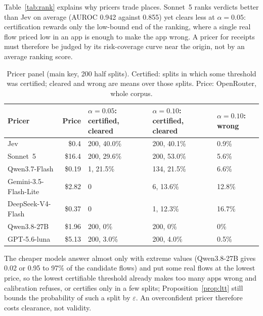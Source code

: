 \begin{table}[t]
\caption{Ranking quality is not what certification rewards. AUROC of the bound (real flows against leak-free sinks, all verdicts), and the certified result over 200 half splits.}
\label{tab:rank}
\small

\end{table}
Table~\ref{tab:rank} explains why pricers trade places.
Sonnet~5 ranks verdicts better than Jev on average (AUROC 0.942 against 0.855) yet clears less at $\alpha=0.05$: certification rewards only the low-bound end of the ranking, where a single real flow priced low in an app is enough to make the app wrong.
A pricer for receipts must therefore be judged by its risk-coverage curve near the origin, not by an average ranking score.
\begin{table}[t]
\caption{Pricer panel (main key, 200 half splits). Certified: splits in which some threshold was certified; cleared and wrong are means over those splits. Price: OpenRouter, whole corpus.}
\label{tab:panel}
\small
\begin{tabular}{@{}lrlll@{}}
\toprule
Pricer & Price & $\alpha=0.05$: certified, cleared & $\alpha=0.10$: certified, cleared & $\alpha=0.10$: wrong\\
\midrule
Jev & \$0.4 & 200, 40.0\% & 200, 40.1\% & 0.9\%\\
Sonnet~5 & \$16.4 & 200, 29.6\% & 200, 53.0\% & 5.6\%\\
Qwen3.7-Flash & \$0.19 & 1, 21.5\% & 134, 21.5\% & 6.6\%\\
Gemini-3.5-Flash-Lite & \$2.82 & 0 & 6, 13.6\% & 12.8\%\\
DeepSeek-V4-Flash & \$0.37 & 0 & 1, 12.3\% & 16.7\%\\
Qwen3.8-27B & \$1.96 & 200, 0\% & 200, 0\% & 0\%\\
GPT-5.6-luna & \$5.13 & 200, 3.0\% & 200, 4.0\% & 0.5\%\\
\bottomrule
\end{tabular}
\end{table}
The cheaper models answer almost only with extreme values (Qwen3.8-27B gives 0.02 or 0.95 to 97\% of the candidate flows) and put some real flows at the lowest price, so the lowest certifiable threshold already makes too many apps wrong and calibration refuses, or certifies only in a few splits; Proposition~\ref{prop:ltt} still bounds the probability of such a split by $\varepsilon$.
An overconfident pricer therefore costs clearance, not validity.


